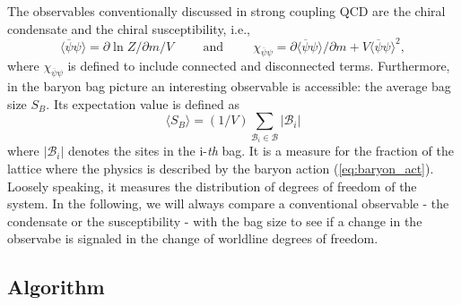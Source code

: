 \documentclass{PoS}
\begin{document}
The observables conventionally discussed in strong coupling QCD are the chiral condensate and the chiral susceptibility, i.e.,
\begin{equation}
\langle \overline{\psi}\psi \rangle = \partial \ln Z/\partial m / V \hspace{1cm} \text{and} \hspace{1cm} \chi_{\overline{\psi}\psi} = \partial \langle\overline{\psi}\psi\rangle/\partial m + V\langle \overline{\psi}\psi \rangle^2,
\end{equation}
where $ \chi_{\overline{\psi}\psi}$ is defined to include connected and disconnected terms. Furthermore, in the baryon bag picture an interesting observable is accessible: the average bag size $S_B$. Its expectation value is defined as
\begin{equation}
\langle S_B \rangle = (1/V) \sum_{\mathcal{B}_i \in \mathcal{B}} |\mathcal{B}_i|
\end{equation}
where $|\mathcal{B}_i|$ denotes the sites in the i-\textit{th} bag. It is a measure for the fraction of the lattice where the physics is described by the baryon action (\ref{eq:baryon_act}). Loosely speaking, it measures the distribution of degrees of freedom of the system. In the following, we will always compare a conventional observable - the condensate or the susceptibility - with the bag size to see if a change in the observabe is signaled in the change of worldline degrees of freedom.
\subsection{Algorithm}
\end{document}
